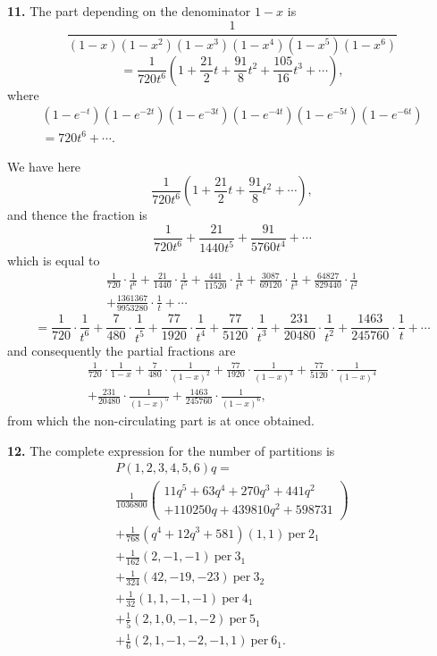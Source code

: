 \documentclass[11pt,a4paper]{book}
\begin{document}
\begin{center}
\medskip
\noindent\textbf{11.} The part depending on the denominator $1-x$ is
\[\frac{1}{(1-x)(1-x^2)(1-x^3)(1-x^4)(1-x^5)(1-x^6)}\]
\[= \frac{1}{720t^6}\left(1 + \frac{21}{2}t + \frac{91}{8}t^2 + \frac{105}{16}t^3 + \cdots\right),\]
where
\begin{multline*}
(1-e^{-t})(1-e^{-2t})(1-e^{-3t})(1-e^{-4t})(1-e^{-5t})(1-e^{-6t}) \\
= 720t^6 + \cdots.
\end{multline*}

We have here
\[\frac{1}{720t^6}\left(1 + \frac{21}{2}t + \frac{91}{8}t^2 + \cdots\right),\]
and thence the fraction is
\[\frac{1}{720t^6} + \frac{21}{1440t^5} + \frac{91}{5760t^4} + \cdots\]
which is equal to
\begin{multline*}
\frac{1}{720}\cdot\frac{1}{t^6} + \frac{21}{1440}\cdot\frac{1}{t^5} + \frac{441}{11520}\cdot\frac{1}{t^4} + \frac{3087}{69120}\cdot\frac{1}{t^3} + \frac{64827}{829440}\cdot\frac{1}{t^2} \\
+ \frac{1361367}{9953280}\cdot\frac{1}{t} + \cdots
\end{multline*}
\[= \frac{1}{720}\cdot\frac{1}{t^6} + \frac{7}{480}\cdot\frac{1}{t^5} + \frac{77}{1920}\cdot\frac{1}{t^4} + \frac{77}{5120}\cdot\frac{1}{t^3} + \frac{231}{20480}\cdot\frac{1}{t^2} + \frac{1463}{245760}\cdot\frac{1}{t} + \cdots\]
and consequently the partial fractions are
\begin{multline*}
\frac{1}{720}\cdot\frac{1}{1-x} + \frac{7}{480}\cdot\frac{1}{(1-x)^2} + \frac{77}{1920}\cdot\frac{1}{(1-x)^3} + \frac{77}{5120}\cdot\frac{1}{(1-x)^4} \\
+ \frac{231}{20480}\cdot\frac{1}{(1-x)^5} + \frac{1463}{245760}\cdot\frac{1}{(1-x)^6},
\end{multline*}
from which the non-circulating part is at once obtained.

\newpage

\medskip
\noindent\textbf{12.} The complete expression for the number of partitions is
\begin{multline*}
P(1,2,3,4,5,6)q = \\
\frac{1}{1036800}\left(\begin{array}{c}
11q^5 + 63q^4 + 270q^3 + 441q^2 \\
+ 110250q + 439810q^2 + 598731
\end{array}\right) \\
+ \frac{1}{768}(q^4 + 12q^3 + 581)(1,1)\ \mathrm{per}\ 2_1 \\
+ \frac{1}{162}(2,-1,-1)\ \mathrm{per}\ 3_1 \\
+ \frac{1}{324}(42,-19,-23)\ \mathrm{per}\ 3_2 \\
+ \frac{1}{32}(1,1,-1,-1)\ \mathrm{per}\ 4_1 \\
+ \frac{1}{5}(2,1,0,-1,-2)\ \mathrm{per}\ 5_1 \\
+ \frac{1}{6}(2,1,-1,-2,-1,1)\ \mathrm{per}\ 6_1.
\end{multline*}


\end{center}
\end{document}
